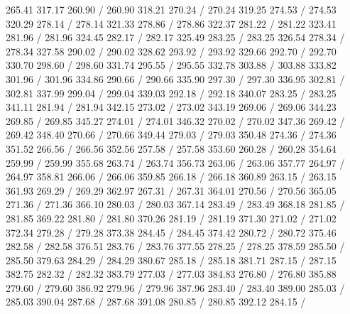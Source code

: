 { 265.41 317.17 260.90 /
 260.90 318.21 270.24 /
 270.24 319.25 274.53 /
 274.53 320.29 278.14 /
 278.14 321.33 278.86 /
 278.86 322.37 281.22 /
 281.22 323.41 281.96 /
 281.96 324.45 282.17 /
 282.17 325.49 283.25 /
 283.25 326.54 278.34 /
 278.34 327.58 290.02 /
 290.02 328.62 293.92 /
 293.92 329.66 292.70 /
 292.70 330.70 298.60 /
 298.60 331.74 295.55 /
 295.55 332.78 303.88 /
 303.88 333.82 301.96 /
 301.96 334.86 290.66 /
 290.66 335.90 297.30 /
 297.30 336.95 302.81 /
 302.81 337.99 299.04 /
 299.04 339.03 292.18 /
 292.18 340.07 283.25 /
 283.25 341.11 281.94 /
 281.94 342.15 273.02 /
 273.02 343.19 269.06 /
 269.06 344.23 269.85 /
 269.85 345.27 274.01 /
 274.01 346.32 270.02 /
 270.02 347.36 269.42 /
 269.42 348.40 270.66 /
 270.66 349.44 279.03 /
 279.03 350.48 274.36 /
 274.36 351.52 266.56 /
 266.56 352.56 257.58 /
 257.58 353.60 260.28 /
 260.28 354.64 259.99 /
 259.99 355.68 263.74 /
 263.74 356.73 263.06 /
 263.06 357.77 264.97 /
 264.97 358.81 266.06 /
 266.06 359.85 266.18 /
 266.18 360.89 263.15 /
 263.15 361.93 269.29 /
 269.29 362.97 267.31 /
 267.31 364.01 270.56 /
 270.56 365.05 271.36 /
 271.36 366.10 280.03 /
 280.03 367.14 283.49 /
 283.49 368.18 281.85 /
 281.85 369.22 281.80 /
 281.80 370.26 281.19 /
 281.19 371.30 271.02 /
 271.02 372.34 279.28 /
 279.28 373.38 284.45 /
 284.45 374.42 280.72 /
 280.72 375.46 282.58 /
 282.58 376.51 283.76 /
 283.76 377.55 278.25 /
 278.25 378.59 285.50 /
 285.50 379.63 284.29 /
 284.29 380.67 285.18 /
 285.18 381.71 287.15 /
 287.15 382.75 282.32 /
 282.32 383.79 277.03 /
 277.03 384.83 276.80 /
 276.80 385.88 279.60 /
 279.60 386.92 279.96 /
 279.96 387.96 283.40 /
 283.40 389.00 285.03 /
 285.03 390.04 287.68 /
 287.68 391.08 280.85 /
 280.85 392.12 284.15 /
}
